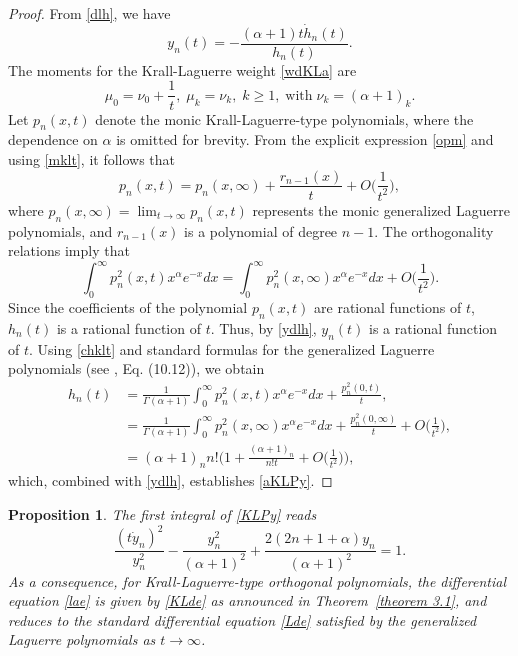\documentclass[10pt, reqno]{amsart}
\numberwithin{equation}{section}
\newtheorem{proposition}{Proposition}[section]
\numberwithin{equation}{section}
\begin{document}
\begin{proof}
From \eqref{dlh}, we have
\begin{equation} \label{ydlh}
y_n(t)=-\frac{(\alpha+1)t\dot{h}_n(t)}{h_n(t)}.
\end{equation}
The moments for the Krall-Laguerre weight \eqref{wdKLa} are
\begin{equation}
\mu_0=\nu_0+\frac{1}{t},\;\mu_k=\nu_k, \;k\geq 1,\; \mbox{with}\; \nu_k=(\alpha+1)_k.\label{mklt}
\end{equation}
Let $p_n(x,t)$ denote the monic Krall-Laguerre-type polynomials, where the dependence on $\alpha$ is omitted for brevity. From the explicit expression \eqref{opm} and using \eqref{mklt}, it follows that 
\begin{equation*}
p_n(x,t)=p_n(x,\infty)+\frac{r_{n-1}(x)}{t}+O\Big(\frac{1}{t^2}\Big),
\end{equation*}
where $p_n(x,\infty)=\lim_{t\to\infty} p_n(x,t)$ represents the monic generalized Laguerre polynomials, and $r_{n-1}(x)$ is a polynomial of degree $n-1$. The orthogonality relations imply that 
\begin{equation}
\int_0^\infty p_n^2(x,t) x^\alpha e^{-x}dx=\int_0^\infty p_n^2(x,\infty) x^\alpha e^{-x}dx+O\Big(\frac{1}{t^2}\Big). \label{chklt}
\end{equation}
Since the coefficients of the polynomial $p_n(x,t)$ are rational functions of $t$, $h_n(t)$ is a rational function of $t$. Thus, by \eqref{ydlh}, $y_n(t)$ is a rational function of $t$. Using \eqref{chklt} and standard formulas for the generalized Laguerre polynomials (see \cite{EMOT}, Eq. (10.12)), we obtain 
\begin{align*}
h_n(t)&=\frac{1}{\Gamma(\alpha+1)}\int_0^\infty p_n^2(x,t) x^\alpha e^{-x}dx+\frac{p_n^2(0,t)}{t},\\
&=\frac{1}{\Gamma(\alpha+1)}\int_0^\infty p_n^2(x,\infty) x^\alpha e^{-x}dx+\frac{p_n^2(0,\infty)}{t}+O\Big(\frac{1}{t^2}\Big),\\
&=(\alpha+1)_n n!\Big(1+\frac{(\alpha+1)_n}{n!t}+O\Big(\frac{1}{t^2}\Big)\Big),
\end{align*}
which, combined with \eqref{ydlh}, establishes \eqref{aKLPy}.
\end{proof}
\begin{proposition} \label{proposition 3.1}
The first integral of \eqref{KLPy} reads
\begin{equation} 
\frac{(t\dot{y}_n)^2}{y_n^2}-\frac{y_n^2}{(\alpha+1)^2}+\frac{2(2n+1+\alpha)y_n}{(\alpha+1)^2}=1.\label{FIPy}
\end{equation}
As a consequence, for Krall-Laguerre-type orthogonal polynomials, the differential equation \eqref{lae} is given by \eqref{KLde} as announced in Theorem~\ref{theorem 3.1}, and reduces to the standard differential equation \eqref{Lde} satisfied by the generalized Laguerre polynomials as $t\to\infty$.
\end{proposition} 
\end{document}

